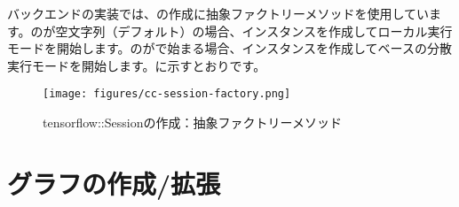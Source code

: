 \begin{content}
バックエンドの\cpp{}実装では、の作成に抽象ファクトリーメソッドを使用しています。のが空文字列（デフォルト）の場合、インスタンスを作成してローカル実行モードを開始します。のがで始まる場合、インスタンスを作成してベースの分散実行モードを開始します。に示すとおりです。

\begin{figure}[H]
\centering
\texttt{[image: figures/cc-session-factory.png]}
\caption{tensorflow::Sessionの作成：抽象ファクトリーメソッド}
 \label{fig:cc-session-factory}
\end{figure}

\end{content}

\section{グラフの作成/拡張}


